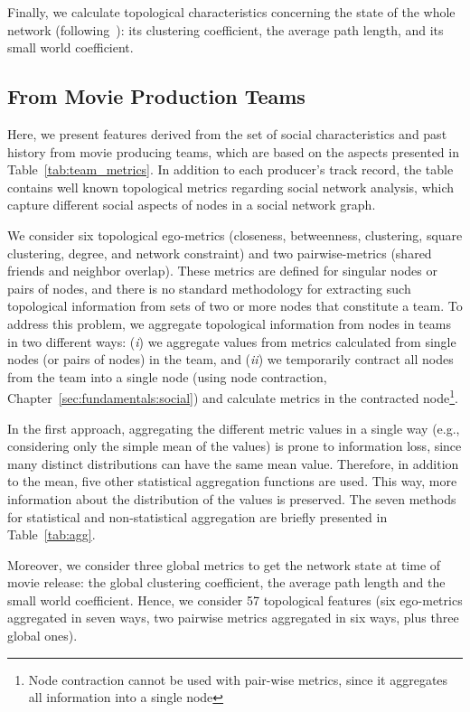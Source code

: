 Finally, we calculate topological characteristics concerning the state of the
whole network (following~\cite{uzzi2005collaboration}): its clustering
coefficient, the average path length, and its small world coefficient.

\subsection{From Movie Production Teams}
Here, we present features derived from the set of social characteristics and
past history from movie producing teams, which are based on the aspects
presented in Table~\ref{tab:team_metrics}. In addition to each producer's track
record, the table contains well known topological metrics regarding social
network analysis, which capture different social aspects of nodes in a social
network graph.

We consider six topological ego-metrics (closeness, betweenness, clustering,
square clustering, degree, and network constraint) and two pairwise-metrics
(shared friends and neighbor overlap). These metrics are defined for singular
nodes or pairs of nodes, and there is no standard methodology for extracting
such topological information from sets of two or more nodes that constitute a
team. To address this problem, we aggregate topological information from nodes
in teams in two different ways: (\textit{i}) we aggregate values from metrics
calculated from single nodes (or pairs of nodes) in the team, and (\textit{ii})
we temporarily contract all nodes from the team into a single node (using node
contraction, Chapter~\ref{sec:fundamentals:social}) and calculate metrics in
the contracted node\footnote{Node contraction cannot be used with pair-wise
metrics, since it aggregates all information into a single node}.

In the first approach, aggregating the different metric values in a single way
(e.g., considering only the simple mean of the values) is prone to information
loss, since many distinct distributions can have the same mean value.
Therefore, in addition to the mean, five other statistical aggregation
functions are used. This way, more information about the distribution of the
values is preserved. The seven methods for statistical and non-statistical
aggregation are briefly presented in Table~\ref{tab:agg}.

Moreover, we consider three global metrics to get the network state at time of
movie release: the global clustering coefficient, the average path length and
the small world coefficient. Hence, we consider 57 topological features (six
ego-metrics aggregated in seven ways, two pairwise metrics aggregated in six
ways, plus three global ones).

